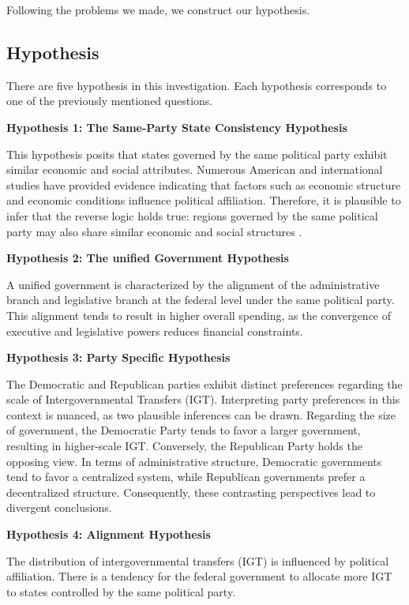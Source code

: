 Following the problems we made, we construct our hypothesis.

\subsection{Hypothesis}

There are five hypothesis in this investigation. Each hypothesis corresponds to one of the previously mentioned questions.

\textbf{Hypothesis 1: The Same-Party State Consistency Hypothesis}

This hypothesis posits that states governed by the same political party exhibit similar economic and social attributes. Numerous American and international studies have provided evidence indicating that factors such as economic structure and economic conditions influence political affiliation. Therefore, it is plausible to infer that the reverse logic holds true: regions governed by the same political party may also share similar economic and social structures \parencite{Alan2009Partisanship,2006Economic, 62b81da7-cc78-33f9-98a3-0a8d03976c2c}.

\textbf{Hypothesis 2: The unified Government Hypothesis}

A unified government is characterized by the alignment of the administrative branch and legislative branch at the federal level under the same political party. This alignment tends to result in higher overall spending, as the convergence of executive and legislative powers reduces financial constraints.

\textbf{Hypothesis 3: Party Specific Hypothesis}

The Democratic and Republican parties exhibit distinct preferences regarding the scale of Intergovernmental Transfers (IGT). Interpreting party preferences in this context is nuanced, as two plausible inferences can be drawn. Regarding the size of government, the Democratic Party tends to favor a larger government, resulting in higher-scale IGT. Conversely, the Republican Party holds the opposing view. In terms of administrative structure, Democratic governments tend to favor a centralized system, while Republican governments prefer a decentralized structure. Consequently, these contrasting perspectives lead to divergent conclusions.

\textbf{Hypothesis 4: Alignment Hypothesis}

The distribution of intergovernmental transfers (IGT) is influenced by political affiliation. There is a tendency for the federal government to allocate more IGT to states controlled by the same political party.


